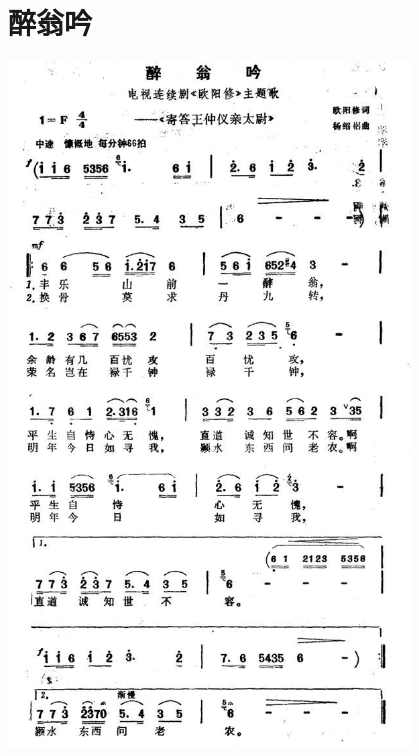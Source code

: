 \documentclass[cn,pad,twocol]{elegantbook}
\begin{document}
\section{醉翁吟} \includegraphics[width=0.8\textwidth]{rpi400/20210212欧阳修-醉翁吟.png}
\end{document}
